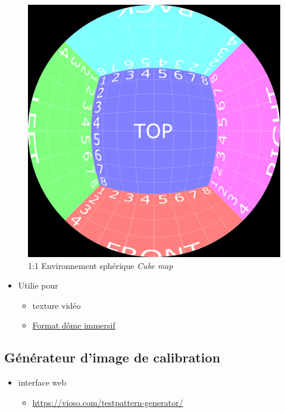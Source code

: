 \documentclass[
  french,
]{book}
\providecommand{\tightlist}{%
  \setlength{\itemsep}{0pt}\setlength{\parskip}{0pt}}
\begin{document}
\begin{figure}
\centering
\includegraphics{medias/lexique/CubeMap_4096x4096.png}
\caption{1:1 Environnement sphérique \emph{Cube map}}
\end{figure}

\begin{itemize}
\tightlist
\item
  Utilie pour

  \begin{itemize}
  \tightlist
  \item
    texture vidéo
  \item
    \href{https://vioso.com/softedge-patterngenerator/domegrids/CubeMap_4096x4096.png}{Format dôme immersif}
  \end{itemize}
\end{itemize}

\hypertarget{guxe9nuxe9rateur-dimage-de-calibration}{%
\subsection{Générateur d'image de calibration}\label{guxe9nuxe9rateur-dimage-de-calibration}}

\begin{itemize}
\tightlist
\item
  interface web

  \begin{itemize}
  \tightlist
  \item
    \url{https://vioso.com/testpattern-generator/}
  \end{itemize}
\end{itemize}
\end{document}
